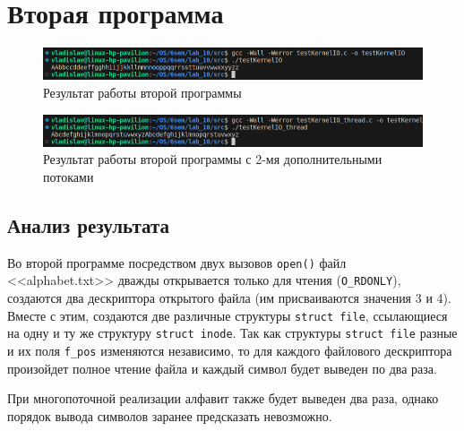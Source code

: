 \section{Вторая программа}

\captionsetup{singlelinecheck = false, justification=raggedright}


\begin{figure}[ht]
	\centering
	\includegraphics[width=\textwidth]{img/2-1}
	\caption{Результат работы второй программы}
\end{figure}

\captionsetup{singlelinecheck = false, justification=raggedright}


\begin{figure}[ht]
	\centering
	\includegraphics[width=\textwidth]{img/2-2}
	\caption{Результат работы второй программы с 2-мя дополнительными потоками}
\end{figure}

\subsection{Анализ результата}

Во второй программе посредством двух вызовов \texttt{open()} файл\\ <<alphabet.txt>>
дважды открывается только для чтения (\texttt{O\_RDONLY}), создаются два дескриптора открытого
файла (им присваиваются значения 3 и 4). Вместе с этим, создаются две различные
структуры \texttt{struct file}, ссылающиеся на одну и ту же структуру
\texttt{struct~inode}. Так как структуры \texttt{struct file} разные и их поля
\texttt{f\_pos} изменяются независимо, то для каждого файлового дескриптора
произойдет полное чтение файла и каждый символ будет выведен по два
раза.

При многопоточной реализации алфавит также будет выведен два раза, однако
порядок вывода символов заранее предсказать невозможно.

